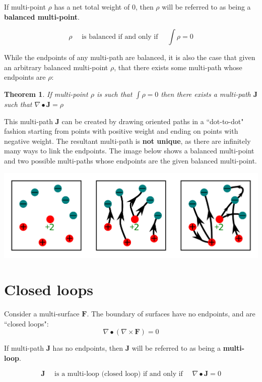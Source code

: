 \documentclass{book}
\newtheorem{thm}{Theorem}
\begin{document}
If multi-point \(\rho\) has a net total weight of \(0\), then \(\rho\) will be referred to as being a {\bf balanced multi-point}.

\[\rho \quad\text{ is balanced if and only if }\quad \int \rho = 0\]

While the endpoints of any multi-path are balanced, it is also the case that given an arbitrary balanced multi-point \(\rho\), that there exists some multi-path whose endpoints are \(\rho\):

\begin{thm}
If multi-point \(\rho\) is such that \(\int \rho = 0\) then there exists a multi-path \(\mathbf{J}\) such that \(\nabla \bullet \mathbf{J} = \rho\)
\end{thm}

This multi-path \(\mathbf{J}\) can be created by drawing oriented paths in a ``dot-to-dot" fashion starting from points with positive weight and ending on points with negative weight. The resultant multi-path is {\bf not unique}, as there are infinitely many ways to link the endpoints. The image below shows a balanced multi-point and two possible multi-paths whose endpoints are the given balanced multi-point. 

\begin{center}
\includegraphics[width = \textwidth]{Boundaries/Path_endpoints/dot-to-dot}
\end{center}




\section{Closed loops}

Consider a multi-surface \(\mathbf{F}\). The boundary of surfaces have no endpoints, and are ``closed loops":
\[\nabla \bullet (\nabla \times \mathbf{F}) = 0\]    

If multi-path \(\mathbf{J}\) has no endpoints, then \(\mathbf{J}\) will be referred to as being a {\bf multi-loop}.

\[\mathbf{J} \quad\text{ is a multi-loop (closed loop) if and only if }\quad \nabla \bullet \mathbf{J} = 0\]
\end{document}
